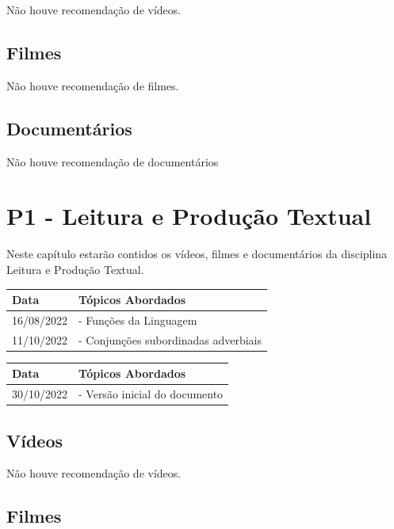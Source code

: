 \documentclass[
]{book}
\begin{document}
Não houve recomendação de vídeos.

\hypertarget{filmes-2}{%
\section{Filmes}\label{filmes-2}}

Não houve recomendação de filmes.

\hypertarget{documentuxe1rios-2}{%
\section{Documentários}\label{documentuxe1rios-2}}

Não houve recomendação de documentários

\hypertarget{p1---leitura-e-produuxe7uxe3o-textual}{%
\chapter{P1 - Leitura e Produção Textual}\label{p1---leitura-e-produuxe7uxe3o-textual}}

Neste capítulo estarão contidos os vídeos, filmes e documentários da disciplina Leitura e Produção Textual.

\begin{longtable}[]{@{}ll@{}}
\toprule()
Data & Tópicos Abordados \\
\midrule()
\endhead
16/08/2022 & - Funções da Linguagem \\
11/10/2022 & - Conjunções subordinadas adverbiais \\
\bottomrule()
\end{longtable}

\begin{longtable}[]{@{}ll@{}}
\toprule()
Data & Tópicos Abordados \\
\midrule()
\endhead
30/10/2022 & - Versão inicial do documento \\
\bottomrule()
\end{longtable}

\hypertarget{vuxeddeos-3}{%
\section{Vídeos}\label{vuxeddeos-3}}

Não houve recomendação de vídeos.

\hypertarget{filmes-3}{%
\section{Filmes}\label{filmes-3}}
\end{document}
